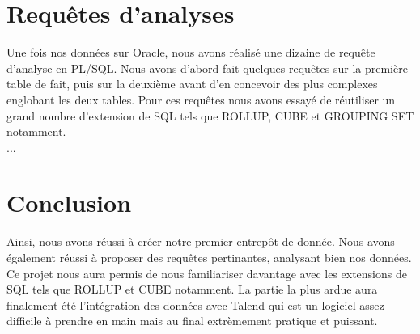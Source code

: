 \documentclass[a4paper,sffamily,12pt]{article}
\begin{document}
		\vspace{0.5cm}
			
	\section{Requêtes d'analyses}

		\vspace{0.5cm}
		
		Une fois nos données sur Oracle, nous avons réalisé une dizaine de requête d'analyse en PL/SQL. Nous avons d'abord fait quelques requêtes sur la première table de fait, puis sur la deuxième avant d'en concevoir des plus complexes englobant les deux tables. Pour ces requêtes nous avons essayé de réutiliser un grand nombre d'extension de SQL tels que ROLLUP, CUBE et GROUPING SET notamment. \\		
		
		... \\
		
		\vspace{0.5cm}
																
	\section{Conclusion}

		\vspace{0.5cm}
		
		Ainsi, nous avons réussi à créer notre premier entrepôt de donnée. Nous avons également réussi à proposer des requêtes pertinantes, analysant bien nos données. Ce projet nous aura permis de nous familiariser davantage avec les extensions de SQL tels que ROLLUP et CUBE notamment. La partie la plus ardue aura finalement été l'intégration des données avec Talend qui est un logiciel assez difficile à prendre en main mais au final extrèmement pratique et puissant. 
						
\end{document}
